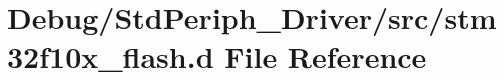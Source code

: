 \hypertarget{stm32f10x__flash_8d}{}\section{Debug/\+Std\+Periph\+\_\+\+Driver/src/stm32f10x\+\_\+flash.d File Reference}
\label{stm32f10x__flash_8d}
